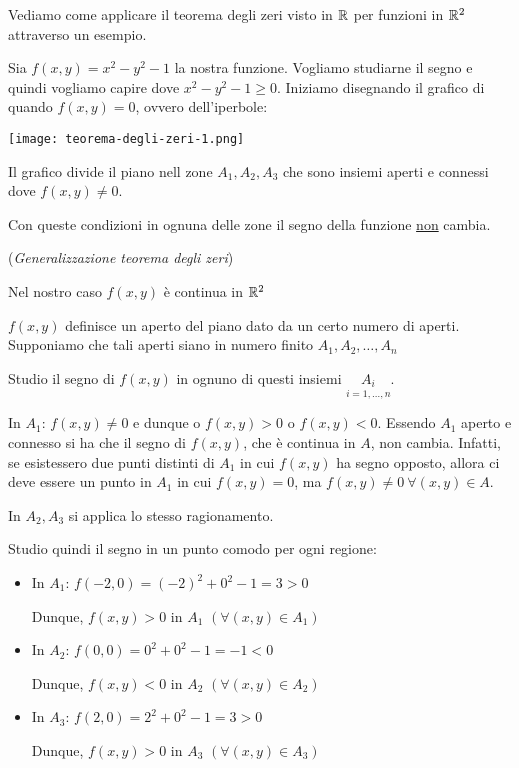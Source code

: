 Vediamo come applicare il teorema degli zeri visto in \(\mathbb{R} \) per funzioni in \(\mathbb{R}^2\) attraverso un esempio.

Sia \(f(x,y) = x^2 - y^2 -1\) la nostra funzione. Vogliamo studiarne il segno e quindi vogliamo capire dove \(x^2-y^2 -1 \ge 0\). Iniziamo disegnando il grafico di quando \(f(x,y) = 0\), ovvero dell'iperbole:

\begin{center}
    \texttt{[image: teorema-degli-zeri-1.png]}
\end{center}

Il grafico divide il piano nell zone \(A_1, A_2, A_3\) che sono insiemi aperti e connessi dove \(f(x,y) \ne 0\).

Con queste condizioni in ognuna delle zone il segno della funzione \underline{non} cambia.

(\textit{Generalizzazione teorema degli zeri})

Nel nostro caso \(f(x,y)\) è continua in \(\mathbb{R}^2\)

\(f(x,y)\) definisce un aperto del piano dato da un certo numero di aperti. Supponiamo che tali aperti siano in numero finito \(A_1, A_2, \ldots, A_n\)

Studio il segno di \(f(x,y)\) in ognuno di questi insiemi \(\underset{i=1, \ldots, n}{A_i}\).

In \(A_1\): \(f(x,y) \ne 0\) e dunque o \(f(x,y) > 0\) o \(f(x,y) < 0\). Essendo \(A_1\) aperto e connesso si ha che il segno di \(f(x,y)\), che è continua in \(A\), non cambia. Infatti, se esistessero due punti distinti di \(A_1\) in cui \(f(x,y)\) ha segno opposto, allora ci deve essere un punto in \(A_1\) in cui \(f(x,y) = 0\), ma \(f(x,y) \ne 0 ~\forall (x,y) \in A\).

In \(A_2, A_3\) si applica lo stesso ragionamento.

Studio quindi il segno in un punto comodo per ogni regione:

\begin{itemize}
    \item In \(A_1\): \(f(-2,0) = {(-2)}^2 + 0^2 - 1 = 3 > 0\)

          Dunque, \(f(x,y) > 0\) in \(A_1\) \((\forall (x,y) \in A_1)\)
    \item In \(A_2\): \(f(0,0) = 0^2 + 0^2 - 1 = -1 < 0\)

          Dunque, \(f(x,y) < 0\) in \(A_2\) \((\forall (x,y) \in A_2)\)
    \item In \(A_3\): \(f(2,0) = 2^2 + 0^2 - 1 = 3 > 0\)

          Dunque, \(f(x,y) > 0\) in \(A_3\) \((\forall (x,y) \in A_3)\)
\end{itemize}

